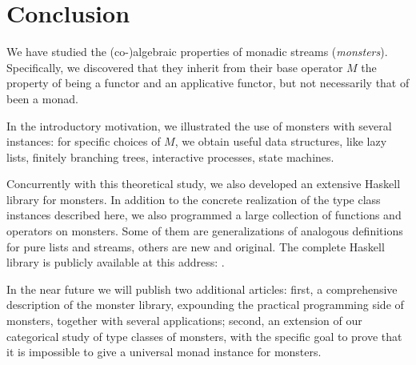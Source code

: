\section{Conclusion}

We have studied the (co-)algebraic properties of monadic streams ({\em monsters}).
Specifically, we discovered that they inherit from their base operator $M$ the property of being a functor and an applicative functor, but not necessarily that of been a monad.

In the introductory motivation, we illustrated the use of monsters with several instances: for specific choices of $M$, we obtain useful data structures, like lazy lists, finitely branching trees, interactive processes, state machines.

Concurrently with this theoretical study, we also developed an extensive Haskell library for monsters.
In addition to the concrete realization of the type class instances described here, we also programmed a large collection of functions and operators on monsters.
Some of them are generalizations of analogous definitions for pure lists and streams, others are new and original.
The complete Haskell library is publicly available at this address: .

In the near future we will publish two additional articles:
first, a comprehensive description of the monster library, expounding the practical programming side of monsters, together with several applications;
second, an extension of our categorical study of type classes of monsters, with the specific goal to prove that it is impossible to give a universal monad instance for monsters.
